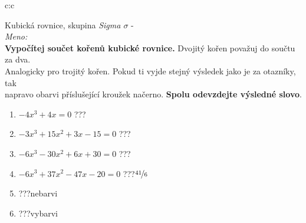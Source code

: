 \documentclass[10pt]{report}
\begin{document}
\clearpage
\thispagestyle{empty}
\begin{tabular}{c:c}
\begin{minipage}[c][99mm][t]{0.49\linewidth}
\begin{center}
\vspace{7mm}
{\huge Kubická rovnice, skupina \textit{Sigma $\sigma$} -}\\[4.5mm]
\textit{Meno:}\phantom{xxxxxxxxxxxxxxxxxxxxxxxxxxxxxxxxxxxxxxxxxxxxxxxxxxxxxxxxxxxxxxxxx}\\[3.5mm]
\textbf{Vypočítej součet kořenů kubické rovnice.} Dvojitý kořen považuj do součtu za dva.\\Analogicky pro trojitý kořen. Pokud ti vyjde stejný výsledek jako je za otazníky, tak\\napravo obarvi příslušející kroužek načerno. \textbf{Spolu odevzdejte výsledné slovo}.\\[3mm]
\begin{minipage}{0.77\linewidth}
\begin{center}
\begin{varwidth}{\textwidth}
\begin{enumerate}
\large
\item $-4x^3+4x=0$\quad \dotfill\; ???\;\dotfill {}
\item $-3x^3+15x^2+3x-15=0$\quad \dotfill\; ???\;\dotfill {}
\item $-6x^3-30x^2+6x+30=0$\quad \dotfill\; ???\;\dotfill {}
\item $-6x^3+37x^2-47x-20=0$\quad \dotfill\; ???\;\dotfill \quad $\nicefrac{41}{6}$
\item \quad \dotfill\; ???\;\dotfill \quad nebarvi
\item \quad \dotfill\; ???\;\dotfill \quad vybarvi
\end{enumerate}
\end{varwidth}
\end{center}
\end{minipage}
\begin{minipage}{0.20\linewidth}
\begin{center}

\end{center}
\end{minipage}
\end{center}
\end{minipage}
\end{tabular}
\end{document}
